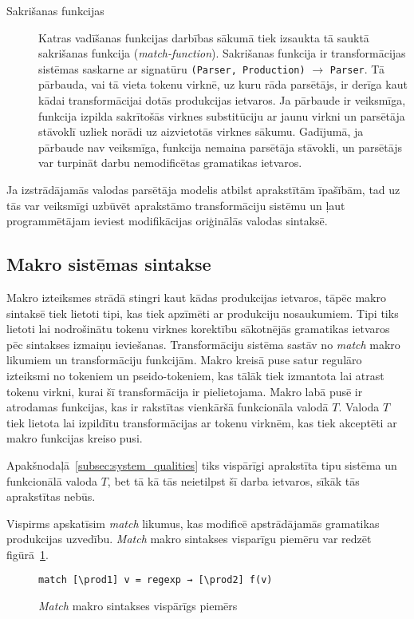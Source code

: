 \begin{description}
\item[Sakrišanas funkcijas]
Katras vadīšanas funkcijas darbības sākumā tiek izsaukta tā sauktā sakrišanas funkcija (\emph{match-function}). Sakrišanas funkcija ir transformācijas sistēmas saskarne ar signatūru \verb|(Parser, Production)| $\to$ \verb|Parser|. Tā pārbauda, vai tā vieta tokenu virknē, uz kuru rāda parsētājs, ir derīga kaut kādai transformācijai dotās produkcijas ietvaros. Ja pārbaude ir veiksmīga, funkcija izpilda sakrītošās virknes substitūciju ar jaunu virkni un parsētāja stāvoklī uzliek norādi uz aizvietotās virknes sākumu. Gadījumā,  ja pārbaude nav veiksmīga, funkcija nemaina parsētāja stāvokli, un parsētājs var turpināt darbu nemodificētas gramatikas ietvaros.
\end{description}

Ja izstrādājamās valodas parsētāja modelis atbilst aprakstītām īpašībām, tad uz tās var veiksmīgi uzbūvēt aprakstāmo transformāciju sistēmu un ļaut programmētājam ieviest modifikācijas oriģinālās valodas sintaksē.

\subsection{Makro sistēmas sintakse}
Makro izteiksmes strādā stingri kaut kādas produkcijas ietvaros, tāpēc makro sintaksē tiek lietoti tipi, kas tiek apzīmēti ar produkciju nosaukumiem. Tipi tiks lietoti lai nodrošinātu tokenu virknes korektību sākotnējās gramatikas ietvaros pēc sintakses izmaiņu ieviešanas. Transformāciju sistēma sastāv no \emph{match} makro likumiem un transformāciju funkcijām. Makro kreisā puse satur regulāro izteiksmi no tokeniem un pseido-tokeniem, kas tālāk tiek izmantota lai atrast tokenu virkni, kurai šī transformācija ir pielietojama. Makro labā pusē ir atrodamas funkcijas, kas ir rakstītas vienkāršā funkcionāla valodā $T$. Valoda $T$ tiek lietota lai izpildītu transformācijas ar tokenu virknēm, kas tiek akceptēti ar makro funkcijas kreiso pusi.

Apakšnodaļā~\ref{subsec:system_qualities} tiks vispārīgi aprakstīta tipu sistēma un funkcionālā valoda $T$, bet tā kā tās neietilpst šī darba ietvaros, sīkāk tās aprakstītas nebūs.

Vispirms apskatīsim \textit{match} likumus, kas modificē apstrādājamās gramatikas produkcijas uzvedību. \emph{Match} makro sintakses visparīgu piemēru var redzēt figūrā~\ref{fig:matchsyntax}.
\begin{figure}[h!]
\begin{verbatim}
match [\prod1] v = regexp → [\prod2] f(v)
\end{verbatim}
\caption{\label{fig:matchsyntax}\emph{Match} makro sintakses vispārīgs piemērs}
\end{figure}

